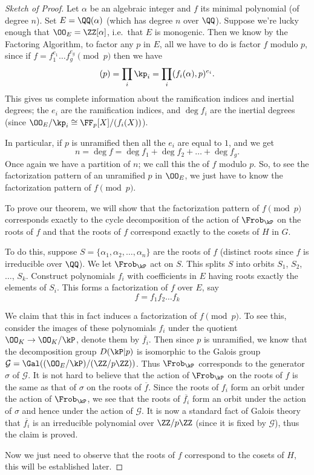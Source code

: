 \begin{proof}[Sketch of Proof]
Let $\alpha$ be an algebraic integer and $f$ its minimal polynomial (of degree $n$).
Set $E = \QQ(\alpha)$ (which has degree $n$ over $\QQ$).
Suppose we're lucky enough that $\OO_E = \ZZ[\alpha]$,
i.e.\ that $E$ is monogenic.
Then we know by the Factoring Algorithm,
to factor any $p$ in $E$, all we have to do is factor $f$ modulo $p$,
since if $f = f_1^{e_1} \dots f_g^{e_g} \pmod p$ then we have
\[ (p) = \prod_i \kp_i = \prod_i (f_i(\alpha), p)^{e_i}. \]
This gives us complete information about the ramification indices and inertial degrees;
the $e_i$ are the ramification indices, and $\deg f_i$ are the inertial degrees
(since $\OO_E / \kp_i \cong \FF_p[X] / (f_i(X))$).

In particular, if $p$ is unramified then all the $e_i$ are equal to $1$, and we get
\[ n = \deg f = \deg f_1 + \deg f_2 + \dots + \deg f_g. \]
Once again we have a partition of $n$;
we call this the  of $f$ modulo $p$.
So, to see the factorization pattern of an unramified $p$ in $\OO_E$,
we just have to know the factorization pattern of $f \pmod p$.

To prove our theorem, we will show that the factorization pattern of $f \pmod p$ corresponds exactly to the cycle decomposition of the action of $\Frob_{\kP}$ on the roots of $f$ and that the roots of $f$ correspond exactly to the cosets of $H$ in $G$.

To do this, suppose $S = \{ \alpha_1,\alpha_2,\dots, \alpha_n\}$ are the roots of $f$ (distinct roots since $f$ is irreducible over $\QQ$). We let $\Frob_{\kP}$ act on $S$. This splits $S$ into orbits $S_1$, $S_2$, $\dots$, $S_k$. Construct polynomials $f_i$ with coefficients in $E$ having roots exactly the elements of $S_i$. This forms a factorization of $f$ over $E$, say \[
f = f_1f_2 \dots f_k
\]

We claim that this in fact induces a factorization of $f \pmod p$. 
To see this, consider the images of these polynomials $f_i$ under the quotient $\OO_K \to \OO_K/\kP$, denote them by $\overline{f_i}$. Then since $p$ is unramified, we know that the decomposition group $D(\kP|p)$ is isomorphic to the Galois group $\mathcal{G} = \Gal((\OO_E/\kP) / (\ZZ/p\ZZ))$. Thus $\Frob_{\kP}$ corresponds to the generator $\sigma$ of $\mathcal{G}$. It is not hard to believe that the action of $\Frob_{\kP}$ on the roots of $f$ is the same as that of $\sigma$ on the roots of $ \overline{f}$. Since the roots of $f_i$ form an orbit under the action of $\Frob_{\kP}$, we see that the roots of $\overline{f_i}$ form an orbit under the action of $\sigma$ and hence under the action of $\mathcal{G}$. It is now a standard fact of Galois theory that $\overline{f_i}$ is an irreducible polynomial over $\ZZ /p\ZZ$ (since it is fixed by $\mathcal{G}$), thus the claim is proved.

Now we just need to observe that the roots of $f$ correspond to the cosets of $H$, this will be established later.
\end{proof}

